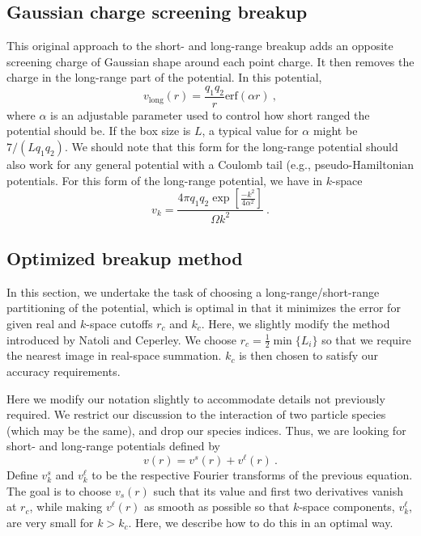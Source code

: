 \subsection{Gaussian charge screening breakup}
This original approach to the short- and long-range breakup adds an
opposite screening charge of Gaussian shape around each point charge.
It then removes the charge in the long-range part of the potential.
In this potential,
\begin{equation}
v_{\text{long}}(r) = \frac{q_1 q_2}{r} \text{erf}(\alpha r)\:,
\end{equation}
where $\alpha$ is an adjustable parameter used to control how
short ranged the potential should be.  If the box size is $L$, a
typical value for $\alpha$ might be $7/(Lq_1 q_2)$. We should note
that this form for the long-range potential should also work for any
general potential with a Coulomb tail (e.g., pseudo-Hamiltonian
potentials.  For this form of the long-range potential, we have in $k$-space
\begin{equation}
v_k = \frac{4\pi q_1 q_2 \exp\left[\frac{-k^2}{4\alpha^2}\right]}{\Omega k^2}\:.
\end{equation}

\subsection{Optimized breakup method}
In this section, we undertake the task of choosing a
long-range/short-range partitioning of the potential, which is optimal
in that it minimizes the error for given real and $k$-space cutoffs
$r_c$ and $k_c$.  Here, we slightly modify the method introduced by
Natoli and Ceperley\cite{Natoli1995}. We choose $r_c =
\frac{1}{2}\min\{L_i\}$ so that we require the nearest image in
real-space summation.  $k_c$ is then chosen to satisfy our
accuracy requirements.

Here we modify our notation slightly to accommodate details not previously required.  We restrict our discussion to the interaction of two
particle species (which may be the same), and drop our species
indices.  Thus, we are looking for short- and long-range potentials
defined by
\renewcommand{\vs}{v^s}
\newcommand{\vl}{v^\ell}
\begin{equation}
v(r) = \vs(r) + \vl(r)\:.
\end{equation}
Define $\vs_k$ and $\vl_k$ to be the respective Fourier transforms of
the previous equation.  The goal is to choose $v_s(r)$ such that its value and
first two derivatives vanish at $r_c$, while making $\vl(r)$ as smooth as
possible so that $k$-space components, $\vl_k$, are very small for
$k>k_c$.  Here, we describe how to do this in an optimal way.

